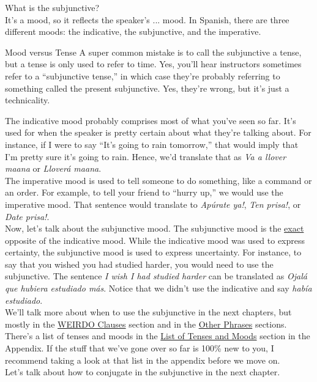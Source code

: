 What is the subjunctive? \\

It's a mood, so it reflects the speaker's ... mood. In Spanish, there are three different moods: the indicative, the subjunctive, and the imperative.
\begin{conf}{Mood versus Tense}
 A super common mistake is to call the subjunctive a tense, but a tense is only used to refer to time. Yes, you'll hear instructors sometimes refer to a ``subjunctive tense,'' in which case they're probably referring to something called the present subjunctive. Yes, they're wrong, but it's just a technicality. 
\end{conf}
The indicative mood probably comprises most of what you've seen so far. It's used for when the speaker is pretty certain about what they're talking about. For instance, if I were to say ``It's going to rain tomorrow,'' that would imply that I'm pretty sure it's going to rain. Hence, we'd translate that as \textit{Va a llover ma{\nye}ana} or \textit{Llover\'{a} ma{\nye}ana}. \\

The imperative mood is used to tell someone to do something, like a command or an order. For example, to tell your friend to ``hurry up,'' we would use the imperative mood. That sentence would translate to \textit{{\exc}Ap\'{u}rate ya!}, \textit{{\exc}Ten prisa!}, or \textit{{\exc}Date prisa!}. \\

Now, let's talk about the subjunctive mood. The subjunctive mood is the \underline{exact} opposite of the indicative mood. While the indicative mood was used to express certainty, the subjunctive mood is used to express uncertainty. For instance, to say that you wished you had studied harder, you would need to use the subjunctive. The sentence \textit{I wish I had studied harder} can be translated as \textit{Ojal\'{a} que hubiera estudiado m\'{a}s}. Notice that we didn't use the indicative and say \textit{hab\'{i}a estudiado}. \\

We'll talk more about when to use the subjunctive in the next chapters, but mostly in the \hyperref[sec:weirdo]{WEIRDO Clauses} section and in the \hyperref[sec:other]{Other Phrases} sections.\\

There's a list of tenses and moods in the \hyperref[subsec:tense]{List of Tenses and Moods} section in the Appendix. If the stuff that we've gone over so far is 100\% new to you, I recommend taking a look at that list in the appendix before we move on. \\

Let's talk about how to conjugate in the subjunctive in the next chapter. 






